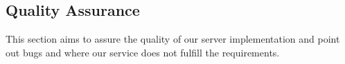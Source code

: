\subsection{Quality Assurance}
This section aims to assure the quality of our server implementation and point out bugs and where our service does not fulfill the requirements.



\newpage